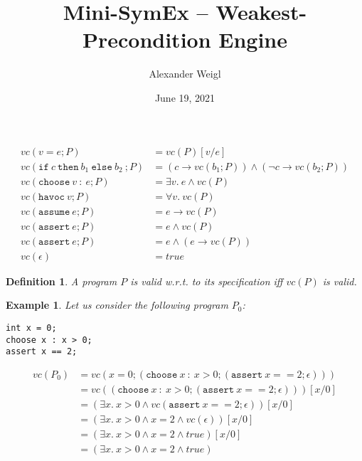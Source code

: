 \documentclass[a4paper]{article}
\newtheorem{definition}{Definition}
\newtheorem{example}{Example}
\DeclareMathOperator{\semi}{;}
\begin{document}
\author{Alexander Weigl}
\title{Mini-SymEx -- Weakest-Precondition Engine}
\date{June 19, 2021}
\maketitle



\begin{align*}
  vc( v = e \semi P)
  & = vc(P)[v/e]
  \\
  vc( \mathtt{if}~c~\mathtt{then}~b_1~\mathtt{else}~b_2~\semi P)
  & = (c \rightarrow vc(b_1\semi P))
    \land (\neg c \rightarrow vc(b_2\semi P))
  \\
  vc( \mathtt{choose}~v~\mathtt{:}~e\semi P)
  & = \exists v.~ e \land vc(P)
  \\
  vc( \mathtt{havoc}~v\semi P)
  & = \forall v.~ vc(P)
  \\
  vc( \mathtt{assume}~e\semi P)
  & = e \rightarrow vc(P)
  \\
  vc( \mathtt{assert}~e\semi P)
  & = e \land vc(P)
  \\
  vc( \mathtt{assert}~e\semi P)
  & = e \land (e \rightarrow vc(P))
  \\
  vc(\epsilon) & = true
\end{align*}

\begin{definition}
  A program $P$ is valid w.r.t. to its specification iff $vc(P)$ is
  valid.
\end{definition}

\begin{example}
Let us consider the following program $P_0$:
\begin{verbatim}
int x = 0;
choose x : x > 0;
assert x == 2;
\end{verbatim}

\begin{align*}
  vc(P_0) & = vc(x = 0 \semi(\mathtt{choose}~x~\mathtt:~x >
            0\semi(\mathtt{assert}~x==2\semi\epsilon)))
  \\
  &= vc((\mathtt{choose}~x~\mathtt:~x >
    0\semi(\mathtt{assert}~x==2\semi\epsilon)))[x/0]
  \\
  &= (\exists x.~ x>0 \land vc(\mathtt{assert}~x==2\semi\epsilon))[x/0]
  \\
  &= (\exists x.~ x>0 \land x=2 \wedge vc(\epsilon) )[x/0]
  \\
  &= (\exists x.~ x>0 \land x=2 \wedge true)[x/0]
  \\
  &= (\exists x.~ x>0 \land x=2 \wedge true)
\end{align*}
\end{example}
\end{document}
